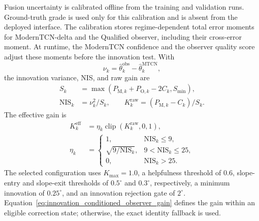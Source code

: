 \documentclass{ieeeaccess}
\begin{document}
Fusion uncertainty is calibrated offline from the training and validation
runs. Ground-truth grade is used only for this calibration and is absent from
the deployed interface. The calibration stores regime-dependent total error
moments for ModernTCN-delta and the Qualified observer, including their
cross-error moment. At runtime, the ModernTCN confidence and the observer
quality score adjust these moments before the innovation test. With
\[
\nu_k=\hat\theta_k^{\mathrm{obs}}-\hat\theta_k^{\mathrm{MTCN}},
\]
the innovation variance, NIS, and raw gain are
\begin{equation}
\begin{aligned}
S_k&=\max(P_{\mathrm{M},k}+P_{\mathrm{O},k}-2C_k,S_{\min}),\\
\mathrm{NIS}_k&=\nu_k^2/S_k,\qquad
K_k^{\mathrm{raw}}=(P_{\mathrm{M},k}-C_k)/S_k .
\end{aligned}
\label{eq:adaptive_observer_gain}
\end{equation}
The effective gain is
\begin{equation}
\begin{aligned}
K_k^{\mathrm{eff}}
&=\eta_k\operatorname{clip}(K_k^{\mathrm{raw}},0,1),\\
\eta_k
&=\begin{cases}
1, & \mathrm{NIS}_k\leq 9,\\
\sqrt{9/\mathrm{NIS}_k}, & 9<\mathrm{NIS}_k\leq 25,\\
0, & \mathrm{NIS}_k>25.
\end{cases}
\end{aligned}
\label{eq:innovation_conditioned_observer_gain}
\end{equation}
The selected configuration uses $K_{\max}=1.0$, a helpfulness threshold of
0.6, slope-entry and slope-exit thresholds of $0.5^{\circ}$ and
$0.3^{\circ}$, respectively, a minimum innovation of $0.25^{\circ}$, and an
innovation rejection gate of $2^{\circ}$. Equation~\eqref{eq:innovation_conditioned_observer_gain}
defines the gain within an eligible correction state; otherwise, the exact
identity fallback is used.
\end{document}
